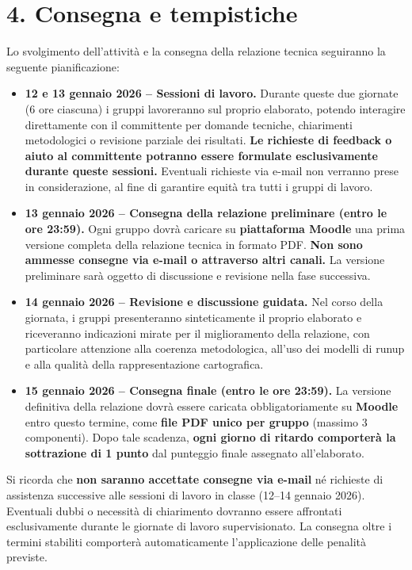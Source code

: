 \documentclass[11pt,a4paper,roman]{moderncv}
\begin{document}
\section*{4. Consegna e tempistiche}
Lo svolgimento dell’attività e la consegna della relazione tecnica seguiranno la seguente pianificazione:

\begin{itemize}
  \item \textbf{12 e 13 gennaio 2026 – Sessioni di lavoro.}  
  Durante queste due giornate (6 ore ciascuna) i gruppi lavoreranno sul proprio elaborato, potendo interagire direttamente con il committente per domande tecniche, chiarimenti metodologici o revisione parziale dei risultati.  
  \textbf{Le richieste di feedback o aiuto al committente potranno essere formulate esclusivamente durante queste sessioni.}  
  Eventuali richieste via e-mail non verranno prese in considerazione, al fine di garantire equità tra tutti i gruppi di lavoro.

  \item \textbf{13 gennaio 2026 – Consegna della relazione preliminare (entro le ore 23:59).}  
  Ogni gruppo dovrà caricare su \textbf{piattaforma Moodle} una prima versione completa della relazione tecnica in formato PDF.  
  \textbf{Non sono ammesse consegne via e-mail o attraverso altri canali.}  
  La versione preliminare sarà oggetto di discussione e revisione nella fase successiva.

  \item \textbf{14 gennaio 2026 – Revisione e discussione guidata.}  
  Nel corso della giornata, i gruppi presenteranno sinteticamente il proprio elaborato e riceveranno indicazioni mirate per il miglioramento della relazione, con particolare attenzione alla coerenza metodologica, all’uso dei modelli di runup e alla qualità della rappresentazione cartografica.

  \item \textbf{15 gennaio 2026 – Consegna finale (entro le ore 23:59).}  
  La versione definitiva della relazione dovrà essere caricata obbligatoriamente su \textbf{Moodle} entro questo termine, come \textbf{file PDF unico per gruppo} (massimo 3 componenti).  
  Dopo tale scadenza, \textbf{ogni giorno di ritardo comporterà la sottrazione di 1 punto} dal punteggio finale assegnato all’elaborato.
\end{itemize}

Si ricorda che \textbf{non saranno accettate consegne via e-mail} né richieste di assistenza successive alle sessioni di lavoro in classe (12–14 gennaio 2026).  
Eventuali dubbi o necessità di chiarimento dovranno essere affrontati esclusivamente durante le giornate di lavoro supervisionato.  
La consegna oltre i termini stabiliti comporterà automaticamente l’applicazione delle penalità previste.  
\end{document}
